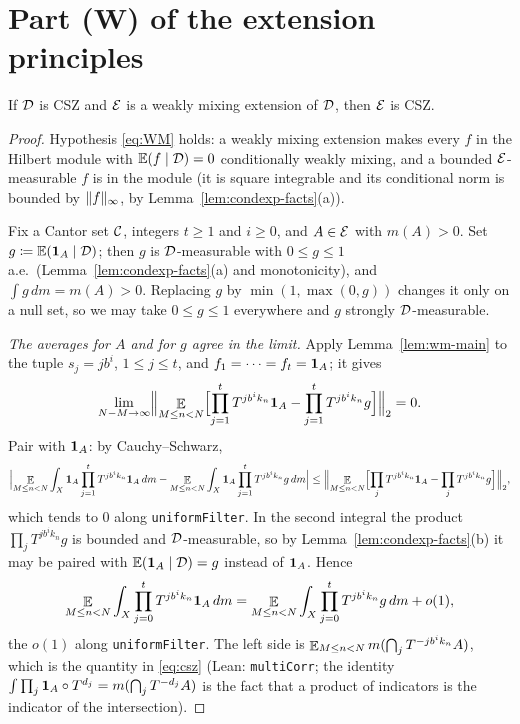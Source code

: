 \section{Part (W) of the extension principles}

\begin{lemma}
  \label{lem:wm-extension}
  \leanok
  If $\mathcal{D}$ is CSZ and $\mathcal{E}$ is a weakly mixing extension of $\mathcal{D}$, then $\mathcal{E}$ is CSZ.
\end{lemma}

\begin{proof}
  Hypothesis \eqref{eq:WM} holds: a weakly mixing extension makes every $f$ in the Hilbert
  module with $\mathbb{E}(f\mid\mathcal{D}) = 0$ conditionally weakly mixing, and a bounded
  $\mathcal{E}$-measurable $f$ is in the module (it is square integrable and its conditional norm is
  bounded by $\lVert f \rVert_\infty$, by Lemma~\ref{lem:condexp-facts}(a)).

  Fix a Cantor set $\mathcal{C}$, integers $t \geq 1$ and $i \geq 0$, and $A \in \mathcal{E}$ with
  $m(A) > 0$.  Set $g \coloneqq \mathbb{E}(\mathbf{1}_A\mid\mathcal{D})$; then $g$ is $\mathcal{D}$-measurable with
  $0 \leq g \leq 1$ a.e.\ (Lemma~\ref{lem:condexp-facts}(a) and monotonicity), and
  $\int g\,dm = m(A) > 0$.  Replacing $g$ by $\min(1,\max(0,g))$ changes it only on a null set,
  so we may take $0 \leq g \leq 1$ everywhere and $g$ strongly $\mathcal{D}$-measurable.

  \emph{The averages for $A$ and for $g$ agree in the limit.}  Apply Lemma~\ref{lem:wm-main} to
  the tuple $s_j = jb^i$, $1 \leq j \leq t$, and $f_1 = \cdots = f_t = \mathbf{1}_A$; it gives
  \[
    \lim_{N-M \to \infty} \Bigl\lVert \mathop{\mathbb{E}}_{M \leq n < N} \Bigl[ \prod_{j=1}^{t} T^{jb^i k_n}\mathbf{1}_A - \prod_{j=1}^{t} T^{jb^ik_n} g \Bigr] \Bigr\rVert_2 = 0 .
  \]
  Pair with $\mathbf{1}_A$: by Cauchy--Schwarz,
  \[
    \Bigl\lvert \mathop{\mathbb{E}}_{M \leq n < N} \int_X \mathbf{1}_A \prod_{j=1}^{t} T^{jb^ik_n}\mathbf{1}_A\,dm
      - \mathop{\mathbb{E}}_{M \leq n < N} \int_X \mathbf{1}_A \prod_{j=1}^{t} T^{jb^ik_n} g\,dm \Bigr\rvert
    \leq \Bigl\lVert \mathop{\mathbb{E}}_{M \leq n < N} \Bigl[ \prod_j T^{jb^ik_n}\mathbf{1}_A - \prod_j T^{jb^ik_n} g \Bigr] \Bigr\rVert_2 ,
  \]
  which tends to $0$ along \texttt{uniformFilter}.  In the second integral the product
  $\prod_j T^{jb^ik_n}g$ is bounded and $\mathcal{D}$-measurable, so by
  Lemma~\ref{lem:condexp-facts}(b) it may be paired with $\mathbb{E}(\mathbf{1}_A\mid\mathcal{D}) = g$ instead of
  $\mathbf{1}_A$.  Hence
  \begin{equation}
    \label{eq:wm-ext-compare}
    \mathop{\mathbb{E}}_{M \leq n < N} \int_X \prod_{j=0}^{t} T^{jb^i k_n}\mathbf{1}_A\,dm
      = \mathop{\mathbb{E}}_{M \leq n < N} \int_X \prod_{j=0}^{t} T^{jb^ik_n} g\,dm + o(1) ,
  \end{equation}
  the $o(1)$ along \texttt{uniformFilter}.  The left side is $\mathop{\mathbb{E}}_{M \leq n < N} m(\bigcap_{j} T^{-jb^ik_n}A)$,
  which is the quantity in \eqref{eq:csz} (Lean: \texttt{multiCorr}; the identity
  $\int \prod_j \mathbf{1}_A \circ T^{d_j} = m(\bigcap_j T^{-d_j}A)$ is the fact that a product of
  indicators is the indicator of the intersection).


\end{proof}
